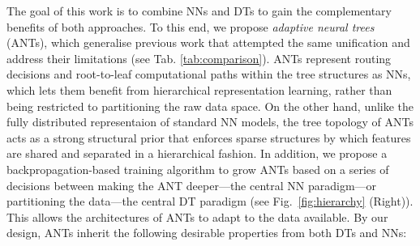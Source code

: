 The goal of this work is to combine NNs and DTs to gain the complementary benefits of both approaches. To this end, we propose \textit{adaptive neural trees} (ANTs), which generalise previous work that attempted the same unification \cite{suarez1999globally,irsoy2012soft,laptev2014convolutional,rota2014neural,kontschieder2015deep,frosst2017distilling,xiao2017ndt} and address their limitations (see Tab. \ref{tab:comparison}). 
ANTs represent routing decisions and root-to-leaf computational paths within the tree structures as NNs, which lets them benefit from hierarchical representation learning, rather than being restricted to partitioning the raw data space. On the other hand, unlike the fully distributed representaion of standard NN models, the tree topology of ANTs acts as a strong structural prior that enforces sparse structures by which features are shared and separated in a hierarchical fashion. In addition, we propose a backpropagation-based training algorithm to grow ANTs based on a series of decisions between making the ANT deeper---the central NN paradigm---or partitioning the data---the central DT paradigm (see Fig.~\ref{fig:hierarchy} (Right)). This allows the architectures of ANTs to adapt to the data available. By our design, ANTs inherit the following desirable properties from both DTs and NNs:


